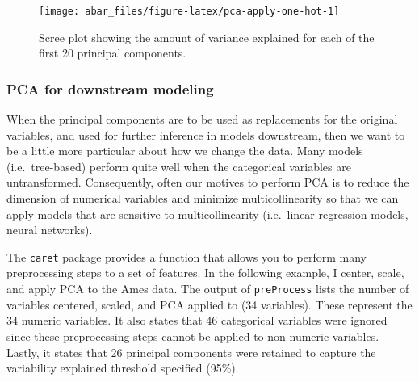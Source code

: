 \documentclass[]{book}
\theoremstyle{definition}
\theoremstyle{definition}
\theoremstyle{definition}
\theoremstyle{remark}
\begin{document}
\begin{figure}

{\centering \texttt{[image: abar\_files/figure-latex/pca-apply-one-hot-1]} 

}

\caption{Scree plot showing the amount of variance explained for each of the first 20 principal components.}\label{fig:pca-apply-one-hot}
\end{figure}

\hypertarget{pca-for-downstream-modeling}{%
\subsubsection{PCA for downstream
modeling}\label{pca-for-downstream-modeling}}

When the principal components are to be used as replacements for the
original variables, and used for further inference in models downstream,
then we want to be a little more particular about how we change the
data. Many models (i.e.~tree-based) perform quite well when the
categorical variables are untransformed. Consequently, often our motives
to perform PCA is to reduce the dimension of numerical variables and
minimize multicollinearity so that we can apply models that are
sensitive to multicollinearity (i.e.~linear regression models, neural
networks).

The \texttt{caret} package provides a function that allows you to
perform many preprocessing steps to a set of features. In the following
example, I center, scale, and apply PCA to the Ames data. The output of
\texttt{preProcess} lists the number of variables centered, scaled, and
PCA applied to (34 variables). These represent the 34 numeric variables.
It also states that 46 categorical variables were ignored since these
preprocessing steps cannot be applied to non-numeric variables. Lastly,
it states that 26 principal components were retained to capture the
variability explained threshold specified (95\%).
\end{document}
